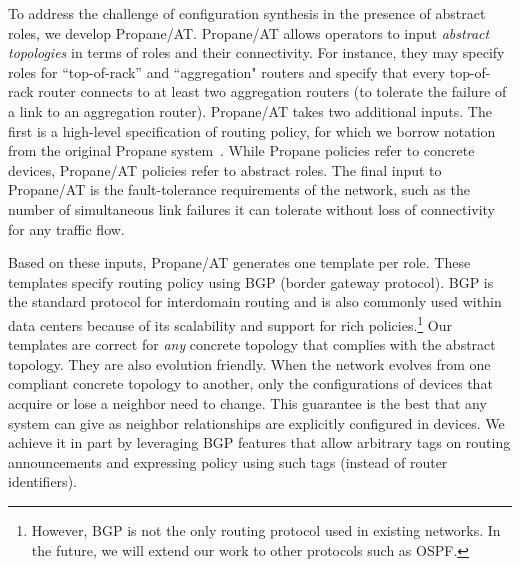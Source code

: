 \documentclass[numbers, 10pt]{sigplanconf}
\newcommand{\sysname}{{\text{}\small \sf Propane/AT}\xspace}
\newcommand{\Propane}{{\text{}\small \sf Propane}\xspace}
\begin{document}
To address the challenge of configuration synthesis in the presence of abstract roles, we develop \sysname. 
\sysname
allows operators to input \emph{abstract topologies} in terms of roles
and their connectivity. For instance, they may specify roles for ``top-of-rack''
and ``aggregation" routers and specify that every top-of-rack router connects to
at least two aggregation routers (to tolerate the failure of a link to an
aggregation router). \sysname takes two additional inputs. 
The first is a  high-level specification of routing policy, for which we borrow notation from the original
\Propane system~\cite{propane}.  While \Propane policies refer to concrete devices,
\sysname policies refer to abstract roles.
The final input to \sysname is the fault-tolerance requirements of the network, such as the number of simultaneous link failures it can tolerate without loss of connectivity for any traffic flow. 


Based on these inputs, \sysname generates one template per role. 
These templates specify routing policy using BGP (border gateway protocol). 
BGP is the standard protocol for interdomain routing and is also commonly used within data centers because of its scalability and support for rich policies.\footnote{However, BGP is not the only routing protocol used in existing networks. In the future, we will extend our work to  other protocols such as OSPF.}
%
Our templates are correct for {\em any} concrete topology that complies with the abstract topology. They are also evolution friendly. 
When the network evolves from one compliant concrete topology to another, only the configurations of devices that acquire or lose a neighbor need to change. 
This guarantee is the best that any system can give as neighbor relationships are explicitly 
configured in devices.  We achieve it in part by leveraging BGP features that allow arbitrary tags on routing announcements and expressing policy using such tags (instead of router identifiers). 
\end{document}
